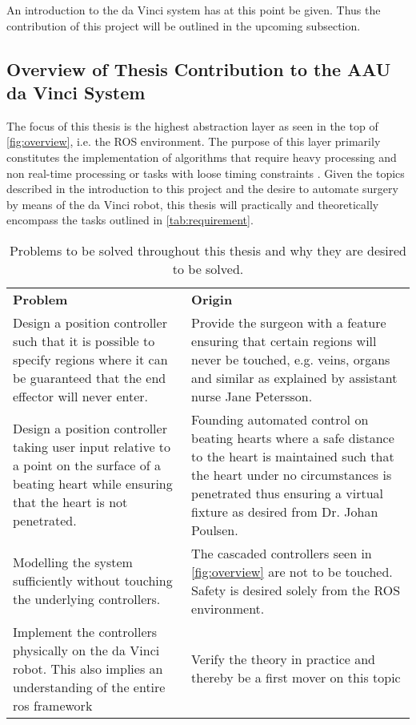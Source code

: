An introduction to the da Vinci system has at this point be given. Thus the contribution of this project will be outlined in the upcoming subsection.


\subsection{Overview of Thesis Contribution to the AAU da Vinci System}\label{sec:project_overview}
The focus of this thesis is the highest abstraction layer as seen in the top of \autoref{fig:overview}, i.e. the ROS environment. The purpose of this layer primarily constitutes the implementation of algorithms that require heavy processing and non real-time processing or tasks with loose timing constraints \citep{bib:robot_paper}.
Given the topics described in the introduction to this project and the desire to automate surgery by means of the da Vinci robot, this thesis will practically and theoretically encompass the tasks outlined in \autoref{tab:requirement}.
\begin{table}[H]
\begin{tabularx}{\textwidth}{X X}
\rowcolor{HeaderBlue} 
\textbf{Problem} &  \textbf{Origin}\\
Design a position controller such that it is possible to specify regions where it can be guaranteed that the end effector will never enter. & Provide the surgeon with a feature ensuring that certain regions will never be touched, e.g. veins, organs and similar as explained by assistant nurse Jane Petersson. \\
\rowcolor{textBlue} 
Design a position controller taking  user input relative to a point on the surface of a beating heart while ensuring that the heart is not penetrated. & Founding automated control on beating hearts where a safe distance to the heart is maintained such that the heart under no circumstances is penetrated thus ensuring a virtual fixture as desired from Dr. Johan Poulsen. \\
Modelling the system sufficiently without touching the underlying controllers. & The cascaded controllers seen in \autoref{fig:overview} are not to be touched. Safety is desired solely from the ROS environment. \\
\rowcolor{textBlue} 
Implement the controllers physically on the da Vinci robot. This also implies an understanding of the entire \gls{ros} framework & Verify the theory in practice and thereby be a first mover on this topic \\
\end{tabularx}
	\caption{Problems to be solved throughout this thesis and why they are desired to be solved.}
\label{tab:requirement}
\end{table}
